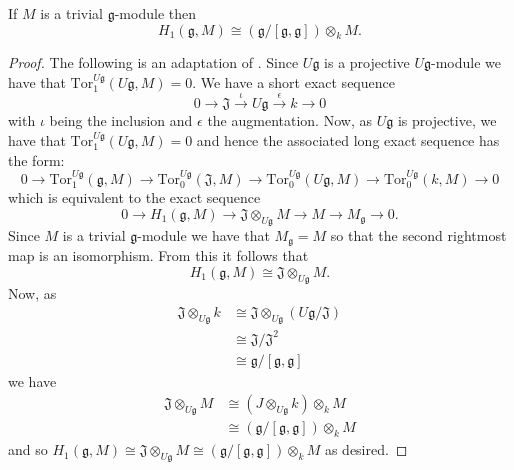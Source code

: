 \begin{corollary}
  \label{cor:abelianization}
  If $ M $ is a trivial $ \mathfrak{g} $-module then
  \begin{equation}
    H_1(\mathfrak{g}, M) \cong (\mathfrak{g}/[\mathfrak{g}, \mathfrak{g}]) \otimes_k M.
  \end{equation}
\end{corollary}
\begin{proof}
  The following is an adaptation of \cite[Corollary 7.3.6]{weibel1994homological}.
  Since $ U\mathfrak{g} $ is a projective $ U\mathfrak{g} $-module we have that $ \text{Tor}_1^{U\mathfrak{g}}(U\mathfrak{g}, M) = 0 $. We have a short exact sequence
  \begin{equation}
    0 \to \mathfrak{J} \xrightarrow{\iota} U\mathfrak{g} \xrightarrow{\epsilon} k \to 0
  \end{equation}
  with $ \iota $ being the inclusion and $ \epsilon $ the augmentation. Now, as $ U\mathfrak{g} $ is projective, we have that $ \text{Tor}_{1}^{U\mathfrak{g}}(U\mathfrak{g}, M) = 0 $ and hence the associated long exact sequence has the form:
  \begin{equation}
    0 \to \text{Tor}_1^{U\mathfrak{g}}(\mathfrak{g}, M) \to \text{Tor}_0^{U\mathfrak{g}}(\mathfrak{J}, M) \to \text{Tor}_0^{U\mathfrak{g}}(U\mathfrak{g}, M) \to \text{Tor}_0^{U\mathfrak{g}}(k, M) \to 0
  \end{equation}
  which is equivalent to the exact sequence
  \begin{equation}
    0 \to H_1(\mathfrak{g}, M) \to \mathfrak{J} \otimes_{U\mathfrak{g}} M \to M \to M_{\mathfrak{g}} \to 0.
  \end{equation}
  Since $ M $ is a trivial $ \mathfrak{g} $-module we have that $ M_\mathfrak{g} = M $ so that the second rightmost map is an isomorphism. From this it follows that
  \begin{equation}
    H_1(\mathfrak{g}, M) \cong \mathfrak{J} \otimes_{U\mathfrak{g}} M.
  \end{equation}
  Now, as
  \begin{align*}
    \mathfrak{J} \otimes_{U\mathfrak{g}} k &\cong \mathfrak{J} \otimes_{U\mathfrak{g}} (U\mathfrak{g}/\mathfrak{J}) \\
                                           &\cong \mathfrak{J}/\mathfrak{J}^2 \\
                                           &\cong \mathfrak{g}/[\mathfrak{g}, \mathfrak{g}]
  \end{align*}
  we have
  \begin{align*}
    \mathfrak{J} \otimes_{U\mathfrak{g}} M &\cong (J \otimes_{U\mathfrak{g}} k) \otimes_k M \\
                                           &\cong (\mathfrak{g}/[\mathfrak{g}, \mathfrak{g}]) \otimes_k M
  \end{align*}
  and so $ H_1(\mathfrak{g}, M) \cong \mathfrak{J} \otimes_{U\mathfrak{g}} M \cong \left( \mathfrak{g}/[\mathfrak{g}, \mathfrak{g}] \right) \otimes_k M $ as desired.
\end{proof}

